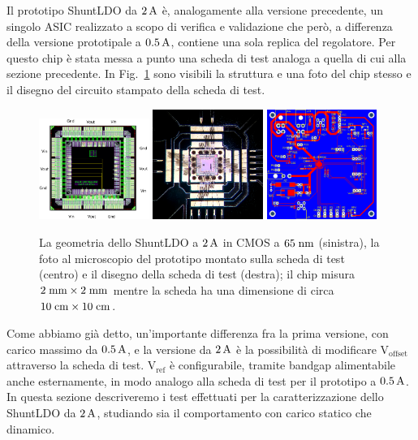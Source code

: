 Il prototipo ShuntLDO da $2\rm \, A$ \`e, analogamente alla versione precedente, un singolo ASIC realizzato a scopo di verifica e validazione che per\`o, a differenza della versione prototipale a $0.5\rm \, A$, contiene una sola replica del regolatore. Per questo chip \`e stata messa a punto una scheda di test analoga a quella di cui alla sezione precedente. In Fig.~\ref{PCB2A} sono visibili la struttura e una foto del chip stesso e il disegno del circuito stampato della scheda di test. 
\begin{figure}
\centering
\includegraphics[width=0.32\textwidth]{Immagini/chipSLDO2A.png}
\hfill
\includegraphics[width=0.32\textwidth]{Immagini/chip2_foto.png}
\hfill
\includegraphics[width=0.32\textwidth]{Immagini/chipcard.png}
\caption{La geometria dello ShuntLDO a $2\rm \, A$ in CMOS a $65\rm \; nm$ (sinistra), la foto al microscopio del prototipo montato sulla scheda di test (centro) e il disegno della scheda di test (destra); il chip misura $2\rm \; mm\times 2\rm \; mm$ mentre la scheda ha una dimensione di circa $10\rm \; cm \times 10\rm \; cm$.}
\label{PCB2A}
\end{figure}
Come abbiamo già detto, un'importante differenza fra la prima versione, con carico massimo da $0.5\rm \, A$, e la versione da $2\rm \, A$ è la possibilità di modificare $\mathrm{V_{offset}}$ attraverso la scheda di test. $\mathrm{V_{ref}}$ \`e configurabile, tramite bandgap alimentabile anche esternamente, in modo analogo alla scheda di test per il prototipo a $0.5\rm \, A$. In questa sezione descriveremo i test effettuati per la caratterizzazione dello ShuntLDO da $2\rm \, A$, studiando sia il comportamento con carico statico che dinamico.

